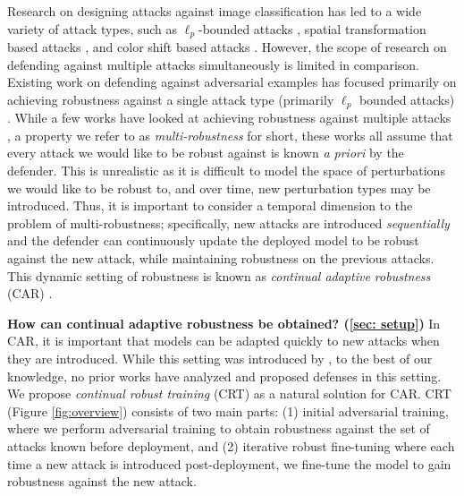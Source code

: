 Research on designing attacks against image classification has led to a wide variety of attack types\citep{madry2017towards, XiaoZ0HLS18, LaidlawF19, laidlaw2020perceptual, wasserstein_attacks, wu2020stronger, brown2017adversarial}, such as $\ell_p$-bounded attacks \citep{madry2017towards}, spatial transformation based attacks \citep{XiaoZ0HLS18}, and color shift based attacks \citep{LaidlawF19}.  However, the scope of research on defending against multiple attacks simultaneously is limited in comparison. Existing work on defending against adversarial examples has focused primarily on achieving robustness against a single attack type (primarily $\ell_p$ bounded attacks) \citep{madry2017towards, zhang2019theoretically, croce2020robustbench, gowal2020uncovering, cohen2019certified,  gowal2021improving, sehwag2021robust}.  While a few works have looked at achieving robustness against multiple attacks \citep{MainiWK20, TB19, madaan2020learning, Croce020,croce2022adversarial}, a property we refer to as \emph{multi-robustness} for short, these works all assume that every attack we would like to be robust against is known \textit{a priori} by the defender.  This is unrealistic as it is difficult to model the space of perturbations we would like to be robust to, and over time, new perturbation types may be introduced.  Thus, it is important to consider a temporal dimension to the problem of multi-robustness; specifically, new attacks are introduced \textit{sequentially} and the defender can continuously update the deployed model to be robust against the new attack, while maintaining robustness on the previous attacks.  This dynamic setting of robustness is known as \textit{continual adaptive robustness} (CAR) \citep{dai2024position}.

\textbf{How can continual adaptive robustness be obtained? (\cref{sec: setup})} In CAR, it is important that models can be adapted quickly to new attacks when they are introduced.  While this setting was introduced by \citet{dai2024position}, to the best of our knowledge, no prior works have analyzed and proposed defenses in this setting.  We propose \textit{continual robust training} (CRT) as a natural solution for CAR.  CRT (Figure \ref{fig:overview}) consists of two main parts: (1) initial adversarial training, where we perform adversarial training to obtain robustness against the set of attacks known before deployment, and (2) iterative robust fine-tuning where each time a new attack is introduced post-deployment, we fine-tune the model to gain robustness against the new attack.

